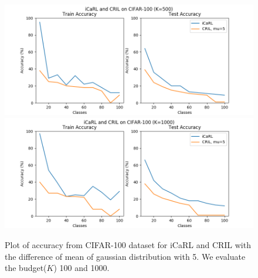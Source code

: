\documentclass[prodmode,acmtecs]{acmsmall} %
\begin{document}
\clearpage
\begin{figure}[hbtp]
\includegraphics[width=120mm]{data/figures/CIFAR-100_K-100.png}
\centering
\includegraphics[width=120mm]{data/figures/CIFAR-100_K-1000.png}
\centering
\caption{Plot of accuracy from CIFAR-100 dataset for iCaRL and CRIL with the difference of mean of gaussian distribution with 5. We evaluate the budget($K$) 100 and 1000. \label{fig:cifar}}
\end{figure}

\clearpage


\end{document}
